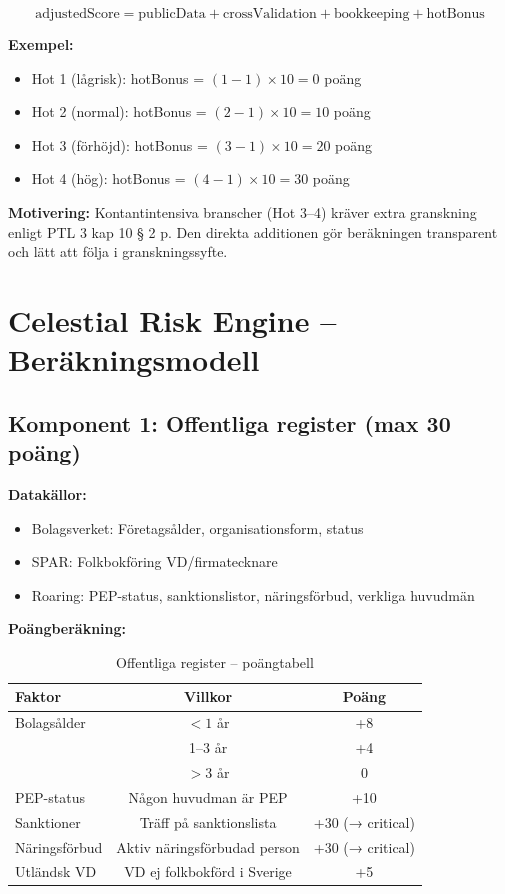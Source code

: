 \documentclass[12pt,a4paper]{article}
\begin{document}
\begin{equation}
\text{adjustedScore} = \text{publicData} + \text{crossValidation} + \text{bookkeeping} + \text{hotBonus}
\end{equation}

\textbf{Exempel:}
\begin{itemize}[noitemsep]
  \item Hot 1 (lågrisk): hotBonus = $(1-1) \times 10 = 0$ poäng
  \item Hot 2 (normal): hotBonus = $(2-1) \times 10 = 10$ poäng
  \item Hot 3 (förhöjd): hotBonus = $(3-1) \times 10 = 20$ poäng
  \item Hot 4 (hög): hotBonus = $(4-1) \times 10 = 30$ poäng
\end{itemize}

\textbf{Motivering:} Kontantintensiva branscher (Hot 3–4) kräver extra granskning enligt PTL 3 kap 10 § 2 p. Den direkta additionen gör beräkningen transparent och lätt att följa i granskningssyfte.

\section{Celestial Risk Engine – Beräkningsmodell}

\subsection{Komponent 1: Offentliga register (max 30 poäng)}

\textbf{Datakällor:}
\begin{itemize}[noitemsep]
  \item Bolagsverket: Företagsålder, organisationsform, status
  \item SPAR: Folkbokföring VD/firmatecknare
  \item Roaring: PEP-status, sanktionslistor, näringsförbud, verkliga huvudmän
\end{itemize}

\textbf{Poängberäkning:}

\begin{table}[h]
\centering
\begin{tabular}{lcc}
\toprule
\textbf{Faktor} & \textbf{Villkor} & \textbf{Poäng} \\
\midrule
Bolagsålder & $< 1$ år & +8 \\
            & 1–3 år & +4 \\
            & $> 3$ år & 0 \\
PEP-status  & Någon huvudman är PEP & +10 \\
Sanktioner  & Träff på sanktionslista & +30 (→ critical) \\
Näringsförbud & Aktiv näringsförbudad person & +30 (→ critical) \\
Utländsk VD & VD ej folkbokförd i Sverige & +5 \\
\bottomrule
\end{tabular}
\caption{Offentliga register – poängtabell}
\end{table}
\end{document}

